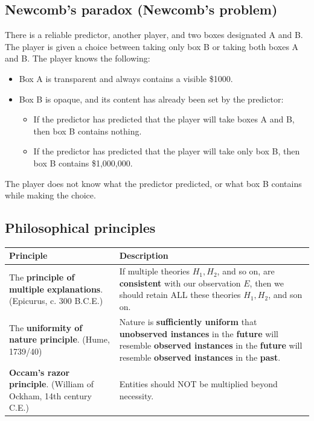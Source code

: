 \documentclass[11pt]{article}
\begin{document}
\subsection{Newcomb's paradox (Newcomb's problem)}
\label{sec:orgdf6722b}
There is a reliable predictor, another player, and two boxes designated A and B. The player is given a choice between taking only box B or taking both boxes A and B. The player knows the following:
\begin{itemize}
\item Box A is transparent and always contains a visible \$1000.
\item Box B is opaque, and its content has already been set by the predictor:
\begin{itemize}
\item If the predictor has predicted that the player will take boxes A and B, then box B contains nothing.
\item If the predictor has predicted that the player will take only box B, then box B contains \$1,000,000.
\end{itemize}
\end{itemize}

The player does not know what the predictor predicted, or what box B contains while making the choice.
\subsection{Philosophical principles}
\label{sec:org44cec31}
\begin{center}
\begin{tabularx}{\textwidth}{|X|X|}
\hline
Principle & Description\\
\hline
The \textbf{principle of multiple explanations}. (Epicurus, c. 300 B.C.E.) & If multiple theories \(H_1, H_2\), and so on, are \textbf{consistent} with our observation \(E\), then we should retain ALL these theories \(H_1, H_2\), and son on.\\
\hline
The \textbf{uniformity of nature principle}. (Hume, 1739/40) & Nature is \textbf{sufficiently uniform} that \textbf{unobserved instances} in the \textbf{future} will resemble \textbf{observed instances} in the \textbf{future} will resemble \textbf{observed instances} in the \textbf{past}.\\
\hline
\textbf{Occam's razor principle}. (William of Ockham, 14th century C.E.) & Entities should NOT be multiplied beyond necessity.\\
\hline
\end{tabularx}
\end{center}
 \newpage
\end{document}
